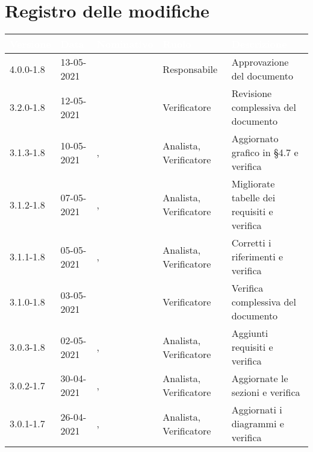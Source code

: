 \section*{Registro delle modifiche}
{
\setcounter{table}{-1}
{
\setlength\arrayrulewidth{1pt}
\renewcommand{\arraystretch}{1.5}
\centering
\begin{longtable}{C{1.7cm} | C{2.5cm} | C{3.2cm} | C{2.7cm}  | C{4.8cm}}
\textcolor{white}{\textbf{Versione}}&
\textcolor{white}{\textbf{Data}}&
\textcolor{white}{\textbf{Nominativo}}&
\textcolor{white}{\textbf{Ruolo}}&
\textcolor{white}{\textbf{Descrizione}}\\	
\endhead

4.0.0-1.8 & 13-05-2021 & \SP{} & Responsabile & Approvazione del documento\\

3.2.0-1.8 & 12-05-2021 & \BM{} & Verificatore & Revisione complessiva del documento\\

3.1.3-1.8 & 10-05-2021 & \PA{}, \ZM{} & Analista, Verificatore & Aggiornato grafico in §4.7 e verifica\\

3.1.2-1.8 & 07-05-2021 & \RA{}, \BM{} & Analista, Verificatore & Migliorate tabelle dei requisiti e verifica\\

3.1.1-1.8 & 05-05-2021 & \PA{}, \ZM{} & Analista, Verificatore & Corretti i riferimenti e verifica\\

3.1.0-1.8 & 03-05-2021 & \BM{} & Verificatore & Verifica complessiva del documento\\

3.0.3-1.8 & 02-05-2021 & \RA{}, \ZM{} & Analista, Verificatore & Aggiunti requisiti e verifica\\

3.0.2-1.7 & 30-04-2021 & \PA{}, \ZM{} & Analista, Verificatore & Aggiornate le sezioni e verifica\\

3.0.1-1.7 & 26-04-2021 & \PA{}, \BM{} & Analista, Verificatore & Aggiornati i diagrammi e verifica\\


\end{longtable}}}
